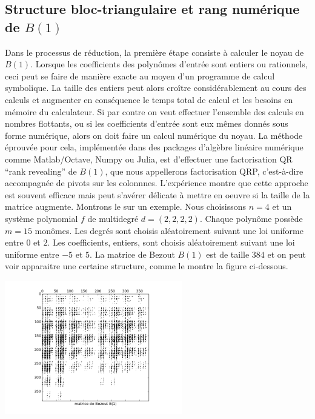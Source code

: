 \documentclass{standalone}
\begin{document}
\subsection{Structure bloc-triangulaire et rang numérique de $B(1)$}
Dans le processus de réduction, la première étape consiste à calculer le noyau de $B(1)$. Lorsque les coefficients des polynômes d'entrée sont entiers ou rationnels, ceci peut se faire de manière exacte au moyen d'un programme de calcul symbolique. La taille des entiers peut alors croître considérablement au cours des calculs et augmenter en conséquence le temps total de calcul et les besoins en mémoire du calculateur. Si par contre on veut effectuer l'ensemble des calculs en nombres flottants, ou si les coefficients d'entrée sont eux mêmes donnés sous forme numérique, alors on doit faire un calcul numérique du noyau. La méthode éprouvée pour cela, implémentée dans des packages d'algèbre linéaire numérique comme Matlab/Octave, Numpy ou Julia, est d'effectuer une factorisation QR ``rank revealing'' de $B(1)$, que nous appellerons factorisation QRP, c'est-à-dire accompagnée de pivots sur les colonnnes. L'expérience montre que cette approche est souvent efficace mais peut s'avérer délicate à mettre en oeuvre si la taille de la matrice augmente. Montrons le sur un exemple. Nous choisissons $n = 4$ et un système polynomial $f$ de multidegré $d = (2, 2, 2, 2)$. Chaque polynôme possède $m = 15$ monômes. Les degrés sont choisis aléatoirement suivant une loi uniforme entre $0$ et $2$. Les coefficients, entiers, sont choisis aléatoirement suivant une loi uniforme entre $-5$ et $5$. La matrice de Bezout $B(1)$ est de taille $384$ et on peut voir apparaitre une certaine structure, comme le montre la figure ci-dessous.
  \begin{center}
    \includegraphics[width=0.58\textwidth]{../png/bez.png}
  \end{center}
\end{document}
